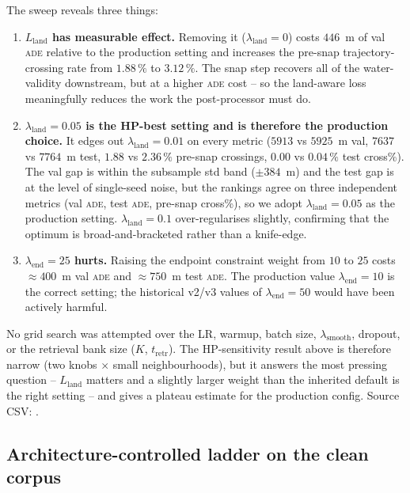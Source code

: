 \documentclass[oneside, a4paper, onecolumn, 11pt]{article}
\newcommand{\ade}{\textsc{ade}}
\DeclareRobustCommand{\fpath}{\path}
\begin{document}
The sweep reveals three things:

\begin{enumerate}[leftmargin=*]
  \item \textbf{$L_{\mathrm{land}}$ has measurable effect.}
        Removing it ($\lambda_{\mathrm{land}} = 0$) costs $446$~m of
        val \ade{} relative to the production setting and increases
        the pre-snap trajectory-crossing rate from $1.88\,\%$ to
        $3.12\,\%$.  The snap step recovers all of the water-validity
        downstream, but at a higher \ade{} cost -- so the land-aware
        loss meaningfully reduces the work the post-processor must do.
  \item \textbf{$\lambda_{\mathrm{land}} = 0.05$ is the HP-best
        setting and is therefore the production choice.}  It edges
        out $\lambda_{\mathrm{land}} = 0.01$ on every metric
        ($5913$ vs $5925$~m val, $7637$ vs $7764$~m test, $1.88$ vs
        $2.36\,\%$ pre-snap crossings, $0.00$ vs $0.04\,\%$ test
        cross\%).  The val gap is within the subsample std band
        ($\pm 384$~m) and the test gap is at the level of single-seed
        noise, but the rankings agree on three independent metrics
        (val \ade{}, test \ade{}, pre-snap cross\%), so we adopt
        $\lambda_{\mathrm{land}} = 0.05$ as the production setting.
        $\lambda_{\mathrm{land}} = 0.1$ over-regularises slightly,
        confirming that the optimum is broad-and-bracketed rather
        than a knife-edge.
  \item \textbf{$\lambda_{\mathrm{end}} = 25$ hurts.}  Raising the
        endpoint constraint weight from $10$ to $25$ costs $\approx
        400$~m val \ade{} and $\approx 750$~m test \ade.  The
        production value $\lambda_{\mathrm{end}} = 10$ is the correct
        setting; the historical v2/v3 values of
        $\lambda_{\mathrm{end}} = 50$ would have been actively
        harmful.
\end{enumerate}

No grid search was attempted over the LR, warmup, batch size,
$\lambda_{\mathrm{smooth}}$, dropout, or the retrieval bank size
($K$, $t_{\mathrm{retr}}$).  The HP-sensitivity result above is
therefore narrow (two knobs $\times$ small neighbourhoods), but it
answers the most pressing question -- $L_{\mathrm{land}}$ matters
and a slightly larger weight than the inherited default is the
right setting -- and gives a plateau estimate for the production
config.  Source CSV: \fpath{results/tier1_eval.csv}.

\subsection{Architecture-controlled ladder on the clean corpus}
\label{sec:ladderclean}
\end{document}
